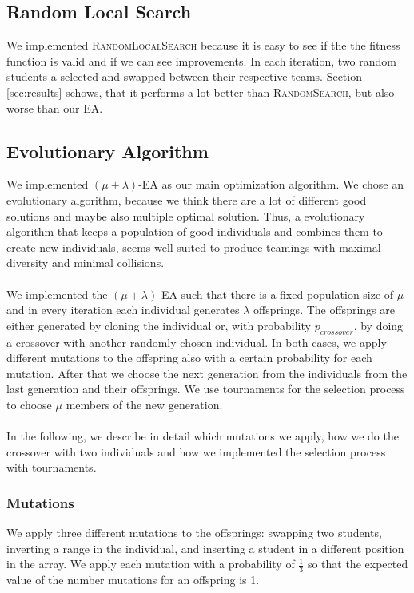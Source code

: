 \documentclass[12pt,a4paper]{article}
\begin{document}
\subsection{Random Local Search}
\label{sec:random-local-search}
We implemented \textsc{RandomLocalSearch} because it is easy to see if the the fitness function is valid and if we can see improvements. In each iteration, two random students a selected and swapped between their respective teams. Section \ref{sec:results} schows, that it performs a lot better than \textsc{RandomSearch}, but also worse than our EA. 

\subsection{Evolutionary Algorithm}
\label{sec:ea}
We implemented $(\mu + \lambda)$-EA as our main optimization algorithm. We chose an evolutionary algorithm, because we think there are a lot of different good solutions and maybe also multiple optimal solution. Thus, a evolutionary algorithm that keeps a population of good individuals and combines them to create new individuals, seems well suited to produce teamings with maximal diversity and minimal collisions.\\
\\
We implemented the $(\mu + \lambda)$-EA such that there is a fixed population size of $\mu$ and in every iteration each individual generates $\lambda$ offsprings. The offsprings are either generated by cloning the individual or, with probability $p_{crossover}$, by doing a crossover with another randomly chosen individual. In both cases, we apply different mutations to the offspring also with a certain probability for each mutation. After that we choose the next generation from the individuals from the last generation and their offsprings. We use tournaments for the selection process to choose $\mu$ members of the new generation.\\
\\
In the following, we describe in detail which mutations we apply, how we do the crossover with two individuals and how we implemented the selection process with tournaments.  

\subsubsection{Mutations}
We apply three different mutations to the offsprings: swapping two students, inverting a range in the individual, and inserting a student in a different position in the array. We apply each mutation with a probability of $\frac{1}{3}$ so that the expected value of the number mutations for an offspring is 1.
\end{document}
